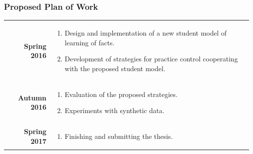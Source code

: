 \documentclass[xcolor=svgnames]{beamer}
\begin{document}
\begin{frame}
\frametitle{Proposed Plan of Work}
\begin{tabularx}{\textwidth}{rX}
	\textbf{Spring 2016} &
		\vspace{-0.5cm}
		\begin{enumerate}
			\item Design and implementation of a new student model of learning of
				facts.
			\item Development of strategies for practice control cooperating with the
				proposed student model.
		\end{enumerate}\\
	\textbf{Autumn 2016} &
		\vspace{-0.5cm}
		\begin{enumerate}
			\item Evaluation of the proposed strategies.
			\item Experiments with synthetic data.
		\end{enumerate}\\
	\textbf{Spring 2017} &
		\vspace{-0.5cm}
		\begin{enumerate}
			\item Finishing and submitting the thesis.
		\end{enumerate}
\end{tabularx}
\end{frame}
\end{document}
